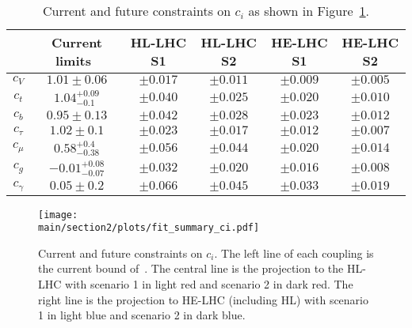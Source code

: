 \begin{table}[ht!]
\begin{center}
\begin{tabular}{ |c||c|c|c|c|c|}
  \hline
  & Current limits~\cite{deBlas:2018tjm}  & HL-LHC S1 & HL-LHC S2 & HE-LHC S1&HE-LHC S2 \\
  \hline
   $c_{V}$&$1.01\pm0.06$ &$\pm 0.017$&$\pm 0.011$&$\pm 0.009$&$\pm 0.005$\\
  $c_{t}$&$1.04^{+0.09}_{-0.1}$&$\pm 0.040$&$\pm 0.025$&$\pm 0.020$&$\pm 0.010$\\
  $c_{b}$&$0.95\pm0.13$ &$\pm 0.042$&$\pm 0.028$&$\pm 0.023$&$\pm 0.012$ \\
  $c_{\tau}$&$1.02\pm 0.1$ &$\pm 0.023$&$\pm 0.017$& $\pm 0.012$&$\pm 0.007$\\
  $c_{\mu}$&$0.58^{+0.4}_{-0.38} $ &$\pm 0.056$&$\pm 0.044$& $\pm 0.020$&$\pm 0.014$\\
  $c_{g}$&$-0.01^{+0.08}_{-0.07} $ &$\pm 0.032$&$\pm 0.020$& $\pm 0.016$&$\pm 0.008$\\
  $c_{\gamma}$ &$0.05\pm0.2 $&$\pm 0.066$&$\pm 0.045$&$\pm 0.033$&$\pm 0.019$\\
\hline
\end{tabular}
\caption{Current and future constraints on $c_{i}$ as shown in Figure~\ref{fig:projection.ci}.}\label{tab:projection.ci}
\end{center}
\end{table}
%
\begin{figure}[ht]
\texttt{[image: \\main/section2/plots/fit\_summary\_ci.pdf]}
\caption{Current and future constraints on $c_{i}$. The left line of each coupling is the current bound of~\cite{deBlas:2018tjm}. The central line is the projection to the HL-LHC with scenario 1 in light red and scenario 2 in dark red. The right line is the projection to HE-LHC (including HL) with scenario 1 in light blue and scenario 2 in dark blue.}\label{fig:projection.ci}
\end{figure}

